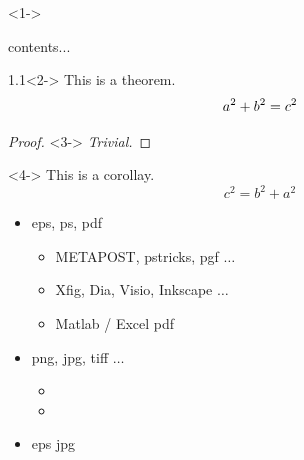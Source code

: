 \documentclass{article}
\begin{document}
	\section{ }	
	
	\begin{frame}<1->
		 \begin{thm}
	        contents...
	        \label{thm-1}
		 \end{thm}
		\begin{block}{ 1.1}<2->
            This is a theorem.
            \begin{equation}
                a^2 + b^2 = c^2
            	\notag	%
            	\label{equ-3}
            	\end{equation}
        \end{block}
    	
		\begin{proof}<3->
            \textit{Trivial.} 
        \end{proof}
		            
        \begin{corollary}<4->
            This is a corollay.
            \begin{equation}
                c^2 = b^2 + a^2
                \label{equ-4}
            \end{equation}
        \end{corollary}
	\end{frame}
	
	\begin{frame}{ }
		\begin{itemize}
			\item   eps, ps, pdf
			\begin{itemize}
				\item METAPOST, pstricks, pgf $\ldots$
				\item Xfig, Dia, Visio, Inkscape $\ldots$
				\item Matlab / Excel   pdf
			\end{itemize}
			\item   png, jpg, tiff $\ldots$
			\begin{itemize}
				\item  
				\item  
			\end{itemize}
		\item  eps jpg 
		\end{itemize}
		
	\end{frame}
\end{document}
